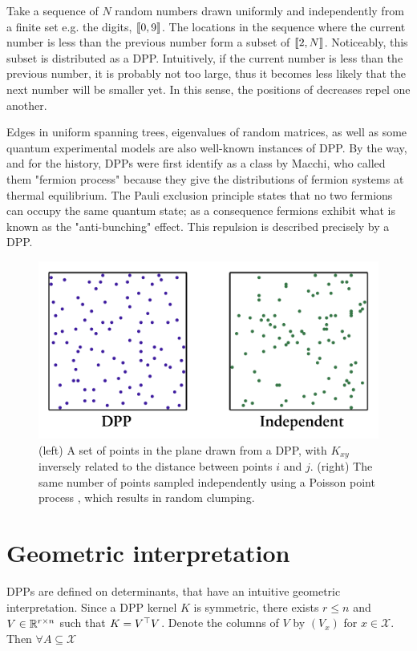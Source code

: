 Take a sequence of $N$ random numbers drawn uniformly and independently from a finite set e.g. the digits, $\llbracket 0,9 \rrbracket$. The locations in the sequence where the current number is less than the previous number form a subset of  $\llbracket 2,N \rrbracket$. Noticeably, this subset is distributed as a DPP. Intuitively, if the current number is less than the previous number, it is probably not too large, thus it becomes less likely that the next number will be smaller yet. In this sense, the positions of decreases repel one another.

Edges in uniform spanning trees, eigenvalues of random matrices, as well as some quantum experimental models are also well-known instances of DPP. By the way, and for the history, DPPs were first identify as a class by Macchi, who called them "fermion process" because they give the distributions of fermion systems at thermal equilibrium. The Pauli exclusion principle states that no two fermions can occupy the same quantum state; as a consequence fermions exhibit what is known as the "anti-bunching" effect. This repulsion is described precisely by a DPP.

\begin{figure}[!ht]
    \centering
    \includegraphics[width=0.6\linewidth]{pics/dpp_vs_iid.png}
    \caption{(left) A set of points in the plane drawn from a DPP, with $K_{x y}$ inversely related to the distance between points $i$ and $j$. (right) The same number of points sampled independently using a Poisson point process , which results in random clumping.}
    \label{fig_dpp_vs_iid}
\end{figure}



\section{Geometric interpretation}
DPPs are defined on determinants, that have an intuitive geometric interpretation. Since a DPP kernel $K$ is symmetric, there exists $r\leq n$ and $V \in \mathbb{R}^{r \times n}$ such that $K= V^\top V$. 
Denote the columns of $V$ by $(V_x)$ for $x\in \mathcal{X}$. Then $\forall A \subseteq \mathcal{X}$

